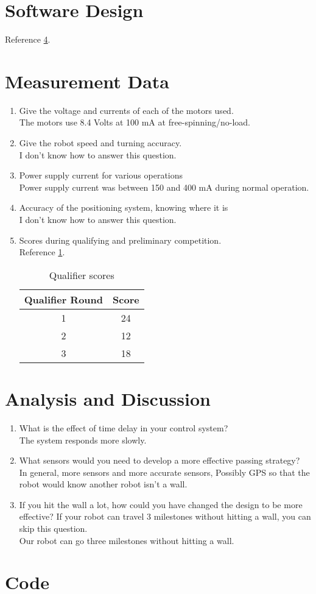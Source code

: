 \documentclass[12pt]{article}
\newcommand{\probb}{}
\newcommand{\soll}{\vspace{0.5em}\\}
\begin{document}
\section{Software Design}
Reference \cref{sec:code}.

\section{Measurement Data}
\begin{enumerate}
\item \probb Give the voltage and currents of each of the motors used.
  \soll The motors use 8.4 Volts at 100 mA at free-spinning/no-load.
\item \probb Give the robot speed and turning accuracy. \soll I don't know how
  to answer this question.
\item \probb Power supply current for various operations \soll Power
  supply current was between 150 and 400 mA during normal operation.
\item \probb Accuracy of the positioning system, knowing where it is
  \soll I don't know how to answer this question.
\item \probb Scores during qualifying and preliminary competition.
  \soll Reference \cref{tab:qualifier}.
  \begin{table}
    \centering
    \begin{tabular}{c|c}
      Qualifier Round & Score \\ \hline
      1 & 24 \\
      2 & 12 \\
      3 & 18 \\
    \end{tabular}
    \caption{Qualifier scores}
    \label{tab:qualifier}
  \end{table}
\end{enumerate}

\section{Analysis and Discussion}

\begin{enumerate}[1)]
\item \probb What is the effect of time delay in your control system?
  \soll The system responds more slowly.
\item \probb What sensors would you need to develop a more effective
  passing strategy? \soll In general, more sensors and more accurate
  sensors, Possibly GPS so that the robot would know another robot
  isn't a wall.
\item \probb If you hit the wall a lot, how could you have changed the
  design to be more effective? If your robot can travel 3 milestones
  without hitting a wall, you can skip this question. \soll Our robot
  can go three milestones without hitting a wall.
\end{enumerate}

\newpage
\section{Code}
\label{sec:code}
\end{document}
